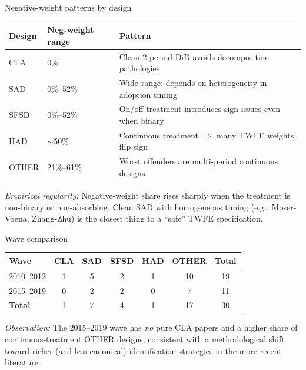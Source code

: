 \documentclass[10pt,aspectratio=169]{beamer}
\begin{document}
\begin{frame}{Negative-weight patterns by design}
\small
\begin{tabular}{lll}
\toprule
\textbf{Design} & \textbf{Neg-weight range} & \textbf{Pattern} \\
\midrule
\textcolor{claColor}{CLA}   & 0\%            & Clean 2-period DiD avoids decomposition pathologies \\
\textcolor{sadColor}{SAD}   & 0\%--52\%     & Wide range; depends on heterogeneity in adoption timing \\
\textcolor{sfsdColor}{SFSD} & 0\%--52\%     & On/off treatment introduces sign issues even when binary \\
\textcolor{hadColor}{HAD}   & $\sim$50\%    & Continuous treatment $\Rightarrow$ many TWFE weights flip sign \\
\textcolor{otherColor}{OTHER} & 21\%--61\%  & Worst offenders are multi-period continuous designs \\
\bottomrule
\end{tabular}

\vspace{0.8em}
\footnotesize\textit{Empirical regularity:} Negative-weight share rises sharply when the treatment is non-binary or non-absorbing. Clean SAD with homogeneous timing (e.g., Moser-Voena, Zhang-Zhu) is the closest thing to a ``safe'' TWFE specification.
\end{frame}

\begin{frame}{Wave comparison}
\small
\centering
\begin{tabular}{lccccc|c}
\toprule
\textbf{Wave} & CLA & SAD & SFSD & HAD & OTHER & \textbf{Total} \\
\midrule
2010--2012   & 1 & 5 & 2 & 1 & 10 & 19 \\
2015--2019   & 0 & 2 & 2 & 0 & 7  & 11 \\
\midrule
\textbf{Total} & 1 & 7 & 4 & 1 & 17 & 30 \\
\bottomrule
\end{tabular}

\vspace{1em}
\footnotesize
\textit{Observation:} The 2015--2019 wave has \emph{no} pure CLA papers and a higher share of continuous-treatment OTHER designs, consistent with a methodological shift toward richer (and less canonical) identification strategies in the more recent literature.
\end{frame}
\end{document}
